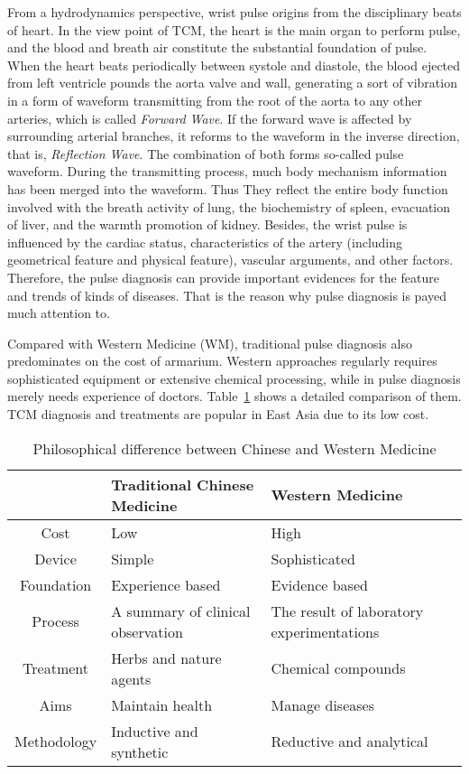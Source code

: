 From a hydrodynamics perspective, wrist pulse origins from the
disciplinary beats
of heart. In the view point of TCM, the heart is the main organ to perform
pulse, and the blood and breath air constitute the substantial
foundation of pulse. When the heart beats periodically between systole
and diastole, the blood ejected from left ventricle pounds the  
aorta valve and wall, generating a sort of vibration in a form of
waveform transmitting from the root of the aorta to any other
arteries, which is called \emph{Forward Wave}. If the forward wave is
affected by surrounding arterial branches, it reforms to the waveform
in the inverse direction, that is, \emph{Reflection Wave}. The
combination of both forms so-called pulse waveform.\cite{XiangheSong2008}
During the transmitting process, much body mechanism information has
been merged into the waveform. Thus They reflect the entire body function involved
with the breath activity of lung, the biochemistry of spleen,
evacuation of liver, and the warmth promotion of kidney. 
Besides, the wrist pulse is influenced by the cardiac status,
characteristics of the artery (including geometrical feature and
physical feature), vascular arguments, and other factors. Therefore,
the pulse diagnosis can provide important evidences for the feature
and trends of kinds of diseases. That is the reason why pulse
diagnosis is payed much attention to. 

Compared with Western Medicine (WM), traditional pulse diagnosis
also predominates on the cost of armarium. Western approaches
regularly requires sophisticated equipment or extensive chemical
processing, while in pulse diagnosis merely needs experience of
doctors. Table~\ref{tab:difftcmwm} shows a detailed comparison of them.
TCM diagnosis and treatments are popular in East Asia due to its low
cost. 

\begin{table}[htbp]
    \centering
    \renewcommand{\arraystretch}{1.5}
    \begin{tabular}{cp{}p{}} 
        \toprule[1.5pt]
        & Traditional Chinese Medicine & Western Medicine \\
        \midrule[1pt]
        Cost & Low & High \\
        Device & Simple & Sophisticated \\
        Foundation & Experience based & Evidence based \\
        Process & A summary of clinical observation & The result of
        laboratory experimentations \\
        Treatment & Herbs and nature agents & Chemical compounds \\
        Aims & Maintain health & Manage diseases \\
        Methodology & Inductive and synthetic & Reductive and
        analytical  \\
        \bottomrule[1.5pt]
    \end{tabular}
    \caption{Philosophical difference between Chinese and Western
    Medicine}
    \label{tab:difftcmwm}
\end{table}

